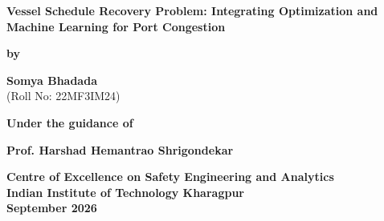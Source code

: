 \documentclass[12pt]{article}
\def\mytitle{Vessel Schedule Recovery Problem: Integrating Optimization and Machine Learning for Port Congestion}
\def\myname{Somya Bhadada}
\def\mysupervisor{Prof. Harshad Hemantrao Shrigondekar}
\def\myrollno{22MF3IM24}
\def\mydep{Centre of Excellence on Safety Engineering and Analytics}
\def\mydegreedate{September 2026}
\begin{document}
\begin{titlepage}
    \begin{center}
        \vspace*{0.5cm} 
        
        \Huge
        \textbf{\mytitle}
        
        \vspace{1.0cm} 
        
        \large
        \textbf{by}
        
        \vspace{0.3cm} 
        
        \textbf{\myname} \\
        (Roll No: \myrollno)
        
        \vspace{1.0cm} 
        
        
        \vspace{1.0cm} 
        
        \textbf{Under the guidance of}
        
        \vspace{0.3cm} 
        
        \textbf{\mysupervisor}
        
        \vfill 
        
        \Large
        \textbf{\mydep}\\
        \textbf{Indian Institute of Technology Kharagpur}\\
        \textbf{\mydegreedate}
        
        \vspace{1cm} 
    \end{center}
\end{titlepage}

\clearpage
{}
\end{document}
